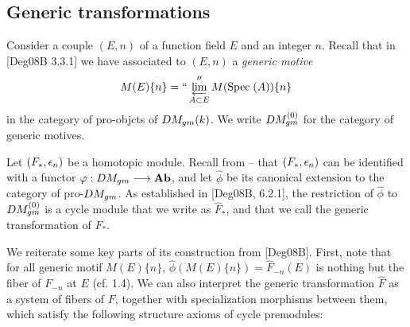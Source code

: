 \subsection{Generic transformations} Consider a couple $(E, n)$
of a function field $E$ and an integer $n$. Recall that in 
[Deg08B 3.3.1] we have associated to $(E, n)$ a \emph{generic 
motive}
\[
M(E)\{n\} = ``\varprojlim_{A \subset E}'' M(\mathrm{Spec}\;(A))\{n\}
\]
in the category of pro-objcts of $DM_{gm}(k)$. We write 
$DM_{gm}^{(0)}$ for the category of generic motives.

Let $(F_*, \epsilon_n)$ be a homotopic module. Recall from -- that
$(F_*, \epsilon_n)$ can be identified with a functor $\varphi: DM_{gm}
\longrightarrow \mathbf{Ab}$, and let $\widehat{\phi}$ be its canonical extension to
the category of pro-$DM_{gm}$. As established in [Deg08B, 6.2.1],
the restriction of $\widehat{\phi}$ to $DM_{gm}^{(0)}$ is a cycle module
that we write as $\widehat{F}_*$, and that we call the generic
transformation of $F_*$.

We reiterate some key parts of its construction from [Deg08B]. 
First, note that for all generic motif $M(E)\{n\}$, 
$\widehat{\phi}(M(E)\{n\}) = \widehat{F}_{-n}(E)$ is nothing
but the fiber of $F_{-n}$ at $E$ (cf. 1.4). We can also interpret
the generic transformation $\widehat{F}$ as a system of fibers 
of $F$, together with specialization morphisms between them,
which satisfy the following structure axioms of cycle premodules:

